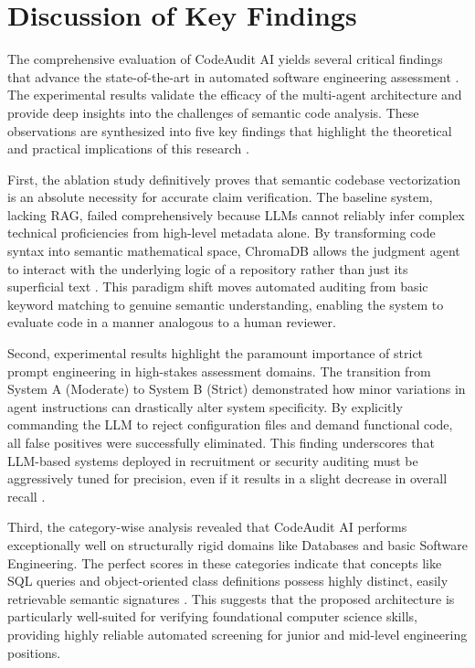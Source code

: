 \section{Discussion of Key Findings}

The comprehensive evaluation of CodeAudit AI yields several critical findings that advance the state-of-the-art in automated software engineering assessment \cite{ref31}. The experimental results validate the efficacy of the multi-agent architecture and provide deep insights into the challenges of semantic code analysis. These observations are synthesized into five key findings that highlight the theoretical and practical implications of this research \cite{ref25, ref30}.

First, the ablation study definitively proves that semantic codebase vectorization is an absolute necessity for accurate claim verification. The baseline system, lacking RAG, failed comprehensively because LLMs cannot reliably infer complex technical proficiencies from high-level metadata alone. By transforming code syntax into semantic mathematical space, ChromaDB allows the judgment agent to interact with the underlying logic of a repository rather than just its superficial text \cite{ref2, ref56}. This paradigm shift moves automated auditing from basic keyword matching to genuine semantic understanding, enabling the system to evaluate code in a manner analogous to a human reviewer.

Second, experimental results highlight the paramount importance of strict prompt engineering in high-stakes assessment domains. The transition from System A (Moderate) to System B (Strict) demonstrated how minor variations in agent instructions can drastically alter system specificity. By explicitly commanding the LLM to reject configuration files and demand functional code, all false positives were successfully eliminated. This finding underscores that LLM-based systems deployed in recruitment or security auditing must be aggressively tuned for precision, even if it results in a slight decrease in overall recall \cite{ref44, ref6}.

Third, the category-wise analysis revealed that CodeAudit AI performs exceptionally well on structurally rigid domains like Databases and basic Software Engineering. The perfect scores in these categories indicate that concepts like SQL queries and object-oriented class definitions possess highly distinct, easily retrievable semantic signatures \cite{ref7, ref62}. This suggests that the proposed architecture is particularly well-suited for verifying foundational computer science skills, providing highly reliable automated screening for junior and mid-level engineering positions.

